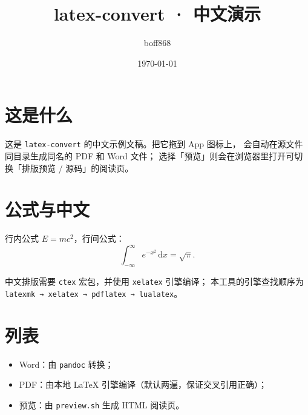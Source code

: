 \documentclass[11pt]{article}
\title{latex-convert · 中文演示}
\author{boff868}
\date{\today}
\begin{document}
\maketitle

\section{这是什么}
这是 \texttt{latex-convert} 的中文示例文稿。把它拖到 App 图标上，
会自动在源文件同目录生成同名的 PDF 和 Word 文件；
选择「预览」则会在浏览器里打开可切换「排版预览 / 源码」的阅读页。

\section{公式与中文}
行内公式 $E = mc^2$，行间公式：
\begin{equation}
  \int_{-\infty}^{\infty} e^{-x^2}\,\mathrm{d}x = \sqrt{\pi}.
\end{equation}

中文排版需要 \texttt{ctex} 宏包，并使用 \texttt{xelatex} 引擎编译；
本工具的引擎查找顺序为
\texttt{latexmk → xelatex → pdflatex → lualatex}。

\section{列表}
\begin{itemize}
  \item Word：由 \texttt{pandoc} 转换；
  \item PDF：由本地 LaTeX 引擎编译（默认两遍，保证交叉引用正确）；
  \item 预览：由 \texttt{preview.sh} 生成 HTML 阅读页。
\end{itemize}
\end{document}
